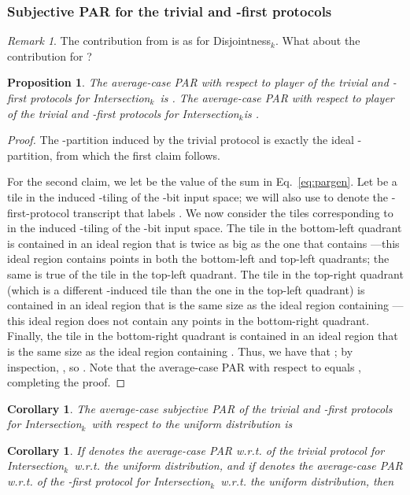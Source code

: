 \documentclass{article}
\theoremstyle{theorem}
\newtheorem{cor}[theorem]{Corollary}
\newtheorem{prop}[theorem]{Proposition}
\theoremstyle{definition}
\theoremstyle{remark}
\newtheorem{remark}[theorem]{Remark}
\newcommand{\disjoint}{{\sc Dis\-joint\-ness}\ensuremath{_k}}
\newcommand{\intersection}{{\sc In\-ter\-sec\-tion}\ensuremath{_k}}
\begin{document}
\subsubsection{Subjective PAR for the trivial and -first protocols}

\begin{remark}
The contribution from  is as for \disjoint.  What about the contribution for ?
\end{remark}

\begin{prop}
The average-case PAR with respect to player  of the trivial and -first protocols for \intersection\ is .  The average-case PAR with respect to player  of the trivial and -first protocols for \intersection is .
\end{prop}
\begin{proof}
The -partition induced by the trivial protocol is exactly the ideal -partition, from which the first claim follows.

For the second claim, we let  be the value of the sum in Eq.~\ref{eq:pargen}.  Let  be a tile in the induced -tiling of the -bit input space; we will also use  to denote the -first-protocol transcript that labels .  We now consider the tiles corresponding to  in the induced -tiling of the -bit input space.  The tile  in the bottom-left quadrant is contained in an ideal region that is twice as big as the one that contains ---this ideal region contains points in both the bottom-left and top-left quadrants; the same is true of the tile  in the top-left quadrant.  The tile  in the top-right quadrant (which is a different -induced tile than the one in the top-left quadrant) is contained in an ideal region that is the same size as the ideal region containing ---this ideal region does not contain any points in the bottom-right quadrant.  Finally, the tile  in the bottom-right quadrant is contained in an ideal region that is the same size as the ideal region containing .  Thus, we have that ; by inspection, , so .  Note that the average-case PAR with respect to  equals , completing the proof.
\end{proof}

\begin{cor}
The average-case subjective PAR of the trivial and -first protocols for \intersection\ with respect to the uniform distribution is

\end{cor}

\begin{cor}
If  denotes the average-case PAR w.r.t.  of the trivial protocol for \intersection\ w.r.t. the uniform distribution, and if  denotes the average-case PAR w.r.t.  of the -first protocol for \intersection\ w.r.t. the uniform distribution, then

\end{cor}
\end{document}
